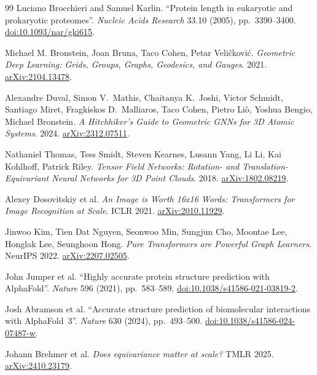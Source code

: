 \documentclass[12pt,a4paper,twoside]{report}
\begin{document}
\begin{thebibliography}{99}
Luciano Brocchieri and Samuel Karlin.
``Protein length in eukaryotic and prokaryotic proteomes''.
\textit{Nucleic Acids Research} 33.10 (2005), pp.~3390--3400.
\href{https://doi.org/10.1093/nar/gki615}{doi:10.1093/nar/gki615}.


Michael M. Bronstein, Joan Bruna, Taco Cohen, Petar Veli\v{c}kovi\'c.
\textit{Geometric Deep Learning: Grids, Groups, Graphs, Geodesics, and Gauges}. 2021.
\href{https://arxiv.org/abs/2104.13478}{arXiv:2104.13478}.

Alexandre Duval, Simon V.~Mathis, Chaitanya K.~Joshi, Victor Schmidt, Santiago Miret, Fragkiskos D.~Malliaros, Taco Cohen, Pietro Li\`o, Yoshua Bengio, Michael Bronstein.
\textit{A Hitchhiker's Guide to Geometric GNNs for 3D Atomic Systems}. 2024.
\href{https://arxiv.org/abs/2312.07511}{arXiv:2312.07511}.

Nathaniel Thomas, Tess Smidt, Steven Kearnes, Lusann Yang, Li Li, Kai Kohlhoff, Patrick Riley.
\textit{Tensor Field Networks: Rotation- and Translation-Equivariant Neural Networks for 3D Point Clouds}. 2018.
\href{https://arxiv.org/abs/1802.08219}{arXiv:1802.08219}.

Alexey Dosovitskiy et al.
\textit{An Image is Worth 16x16 Words: Transformers for Image Recognition at Scale}. ICLR 2021.
\href{https://arxiv.org/abs/2010.11929}{arXiv:2010.11929}.

Jinwoo Kim, Tien Dat Nguyen, Seonwoo Min, Sungjun Cho, Moontae Lee, Honglak Lee, Seunghoon Hong.
\textit{Pure Transformers are Powerful Graph Learners}. NeurIPS 2022.
\href{https://arxiv.org/abs/2207.02505}{arXiv:2207.02505}.

John Jumper et al.
``Highly accurate protein structure prediction with AlphaFold''.
\textit{Nature} 596 (2021), pp.~583--589.
\href{https://doi.org/10.1038/s41586-021-03819-2}{doi:10.1038/s41586-021-03819-2}.

Josh Abramson et al.
``Accurate structure prediction of biomolecular interactions with AlphaFold~3''.
\textit{Nature} 630 (2024), pp.~493--500.
\href{https://doi.org/10.1038/s41586-024-07487-w}{doi:10.1038/s41586-024-07487-w}.

Johann Brehmer et al.
\textit{Does equivariance matter at scale?} TMLR 2025.
\href{https://arxiv.org/abs/2410.23179}{arXiv:2410.23179}.


\end{thebibliography}
\end{document}
